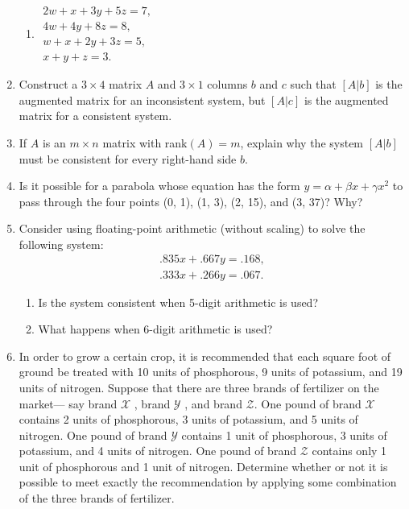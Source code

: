 \begin{enumerate}[leftmargin=*, label=\bfseries 2.3.\arabic*]
\begin{enumerate}[label=(\alph*)]
    \item \(\begin{array}{l}
    2w + x + 3y + 5z = 7, \\
    4w + 4y + 8z = 8, \\
    w + x + 2y + 3z = 5, \\
    x + y + z = 3.
    \end{array}\)
\end{enumerate}

\item Construct a \(3 \times 4\) matrix \(A\) and \(3 \times 1\) columns \(b\) and \(c\) such that \([A|b]\) is the augmented matrix for an inconsistent system, but \([A|c]\) is the augmented matrix for a consistent system.

\item If \(A\) is an \(m \times n\) matrix with rank\((A) = m\), explain why the system \([A|b]\) must be consistent for every right-hand side \(b\).

\item Is it possible for a parabola whose equation has the form \(y = \alpha+\beta x+\gamma x^2\) to pass through the four points (0, 1), (1, 3), (2, 15), and (3, 37)? Why?

\item Consider using floating-point arithmetic (without scaling) to solve the following system:
\[
\begin{array}{l}
.835x + .667y = .168, \\
.333x + .266y = .067.
\end{array}
\]
\begin{enumerate}[label=(\alph*)]
    \item Is the system consistent when 5-digit arithmetic is used?
    
    \item What happens when 6-digit arithmetic is used?
\end{enumerate}

\item In order to grow a certain crop, it is recommended that each square foot of ground be treated with 10 units of phosphorous, 9 units of potassium, and 19 units of nitrogen. 
Suppose that there are three brands of fertilizer on the market— say brand \(\mathcal{X}\) , brand \(\mathcal{Y}\) , and brand \(\mathcal{Z}\).
One pound of brand \(\mathcal{X}\) contains 2 units of phosphorous, 3 units of potassium, and 5 units of nitrogen. One pound of brand \(\mathcal{Y}\) contains 1 unit of phosphorous,
3 units of potassium, and 4 units of nitrogen. One pound of brand \(\mathcal{Z}\) contains only 1 unit of phosphorous and 1 unit of nitrogen.
Determine whether or not it is possible to meet exactly the recommendation by applying some combination of the three brands of fertilizer.


\end{enumerate}

